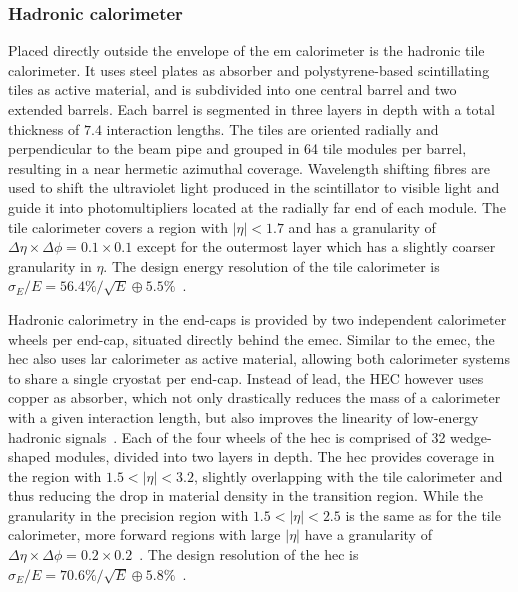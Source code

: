 \subsubsection{Hadronic calorimeter}

Placed directly outside the envelope of the \gls{em} calorimeter is the hadronic tile calorimeter. It uses steel plates as absorber and polystyrene-based scintillating tiles as active material, and is subdivided into one central barrel and two extended barrels. Each barrel is segmented in three layers in depth with a total thickness of $7.4$ interaction lengths. The tiles are oriented radially and perpendicular to the beam pipe and grouped in 64 tile modules per barrel, resulting in a near hermetic azimuthal coverage. Wavelength shifting fibres are used to shift the ultraviolet light produced in the scintillator to visible light and guide it into photomultipliers located at the radially far end of each module. The tile calorimeter covers a region with $\vert\eta\vert <1.7$ and has a granularity of $\Delta \eta \times \Delta \phi = 0.1 \times 0.1$ except for the outermost layer which has a slightly coarser granularity in $\eta$. The design energy resolution of the tile calorimeter is $\sigma_E / E = 56.4\% / \sqrt{E} \oplus 5.5\%$~\cite{Aad:2008zzm}.

Hadronic calorimetry in the end-caps is provided by two independent calorimeter wheels per end-cap, situated directly behind the \gls{emec}. Similar to the \gls{emec}, the \gls{hec} also uses \gls{lar} calorimeter as active material, allowing both calorimeter systems to share a single cryostat per end-cap. Instead of lead, the HEC however uses copper as absorber, which not only drastically reduces the mass of a calorimeter with a given interaction length, but also improves the linearity of low-energy hadronic signals~\cite{Lee:2637852}. Each of the four wheels of the \gls{hec} is comprised of 32 wedge-shaped modules, divided into two layers in depth. The \gls{hec} provides coverage in the region with $1.5 < \vert\eta\vert <3.2$, slightly overlapping with the tile calorimeter and thus reducing the drop in material density in the transition region. While the granularity in the precision region with $1.5 < \vert\eta\vert <2.5$ is the same as for the tile calorimeter, more forward regions with large $\vert\eta\vert$ have a granularity of $\Delta \eta \times \Delta \phi = 0.2 \times 0.2$~\cite{Aad:2008zzm}. The design resolution of the \gls{hec} is $\sigma_E / E = 70.6\% / \sqrt{E} \oplus 5.8\%$~\cite{Aad:2008zzm}.

